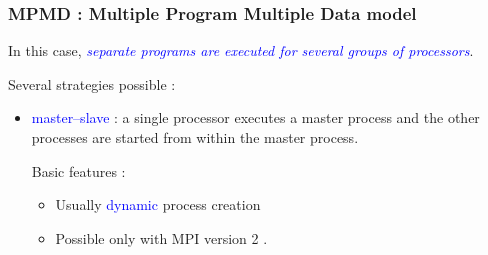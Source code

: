 \documentclass{beamer}
\begin{document}
\begin{frame}
\frametitle{MPMD : Multiple Program Multiple Data model}

In this case, 
\textcolor{blue}{\sl separate programs are executed for several groups of processors}.

Several strategies possible : 
\begin{itemize}
\item \textcolor{blue}{master--slave} : a single
  processor executes a master process and the other processes are started
  from within the master process.

  \begin{minipage}{40mm}
    Basic features :
    \begin{itemize}
    \item Usually \textcolor{blue}{dynamic}
      process creation
    \item Possible only with MPI version 2 .
    \end{itemize}
  \end{minipage}
  \begin{minipage}{55mm}
    \begin{figure}
      \centering
\end{figure}
\end{minipage}
\end{itemize}
\end{frame}
\end{document}
